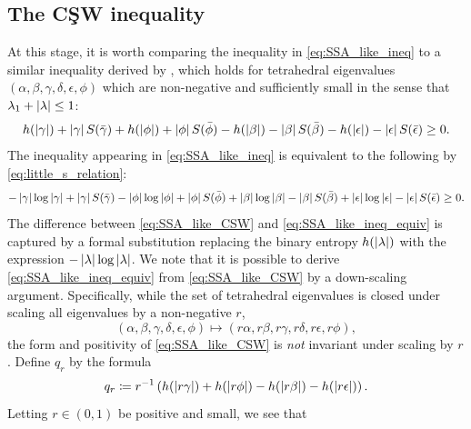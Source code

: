 \documentclass[notitlepage, 10pt]{article}
\begin{document}
\subsection{The C\c{S}W inequality}
At this stage, it is worth comparing the inequality in \cref{eq:SSA_like_ineq} to a similar inequality derived by \citeauthor{christandl2018recoupling} \cite{christandl2018recoupling}, which holds for tetrahedral eigenvalues $(\alpha,\beta,\gamma,\delta,\epsilon,\phi)$ which are non-negative and sufficiently small in the sense that $\lambda_1 + \left|\lambda\right| \leq 1$:
\begin{equation}
    \label{eq:SSA_like_CSW}
    h(\left|\gamma\right|) 
    + \left|\gamma\right| S(\bar \gamma)
    +h(\left|\phi\right|) 
    + \left|\phi\right| S(\bar \phi)  
    -h(\left|\beta\right|) 
    - \left|\beta\right| S(\bar \beta)  
    -h(\left|\epsilon\right|) 
    - \left|\epsilon\right| S(\bar \epsilon)  
    \geq 0.
\end{equation}
The inequality appearing in \cref{eq:SSA_like_ineq} is equivalent to the following by \cref{eq:little_s_relation}:
\begin{equation}
    \label{eq:SSA_like_ineq_equiv}
    -\left|\gamma\right|\log\left|\gamma\right|
    + \left|\gamma\right| S(\bar \gamma)
    -\left|\phi\right|\log\left|\phi\right|
    + \left|\phi\right| S(\bar \phi)  
    +\left|\beta\right|\log\left|\beta\right|
    - \left|\beta\right| S(\bar \beta)  
    +\left|\epsilon\right|\log\left|\epsilon\right|
    - \left|\epsilon\right| S(\bar \epsilon)  
    \geq 0.
\end{equation}
The difference between \cref{eq:SSA_like_CSW} and \cref{eq:SSA_like_ineq_equiv} is captured by a formal substitution replacing the binary entropy $h(\left|\lambda\right|)$ with the expression $-\left|\lambda\right|\log \left|\lambda\right|$.
We note that it is possible to derive \cref{eq:SSA_like_ineq_equiv} from \cref{eq:SSA_like_CSW} by a down-scaling argument.
Specifically, while the set of tetrahedral eigenvalues is closed under scaling all eigenvalues by a non-negative $r$,
\begin{equation}
    \label{eq:tet_scaling}
    (\alpha,\beta,\gamma,\delta,\epsilon,\phi) \mapsto (r\alpha,r\beta,r\gamma,r\delta,r\epsilon,r\phi),
\end{equation}
the form and positivity of \cref{eq:SSA_like_CSW} is \textit{not} invariant under scaling by $r$.
Define $q_{r}$ by the formula
\begin{equation}
    q_{r} \coloneqq r^{-1}\left(
        h(\left|r\gamma\right|) 
        +h(\left|r\phi\right|) 
        -h(\left|r\beta\right|) 
        -h(\left|r\epsilon\right|) 
    \right).
\end{equation}
Letting $r \in (0,1)$ be positive and small, we see that
\end{document}
